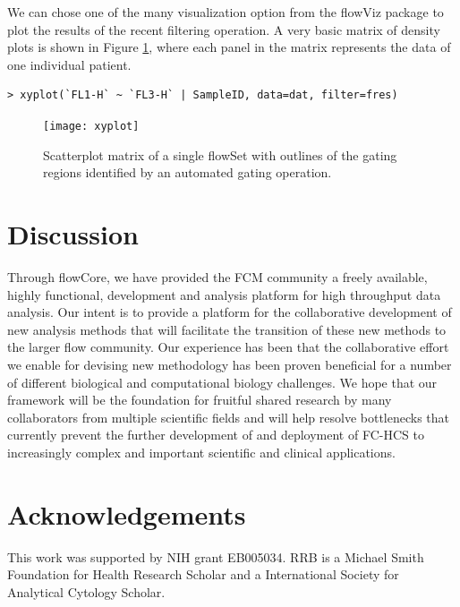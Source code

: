 \documentclass[12pt]{article}
\begin{document}
We can chose one of the many visualization option from the flowViz
package to plot the results of the recent filtering operation. A very
basic matrix of density plots is shown in Figure \ref{xyplot}, where
each panel in the matrix represents the data of one individual
patient.

\begin{verbatim}
> xyplot(`FL1-H` ~ `FL3-H` | SampleID, data=dat, filter=fres)
\end{verbatim}


\begin{figure}[htbp]
\centering
\texttt{[image: xyplot]}
\caption{\label{xyplot}%
Scatterplot matrix of a single flowSet with outlines of the gating
regions identified by an automated gating operation.}
\end{figure}



\section*{Discussion}

Through flowCore, we have provided the FCM community a freely
available, highly functional, development and analysis platform for
high throughput data analysis. Our intent is to provide a platform for
the collaborative development of new analysis methods that will
facilitate the transition of these new methods to the larger flow
community. Our experience has been that the collaborative effort we
enable for devising new methodology has been proven beneficial for a
number of different biological and computational biology challenges.
We hope that our framework will be the foundation for fruitful shared
research by many collaborators from multiple scientific fields and
will help resolve bottlenecks that currently prevent the further
development of and deployment of FC-HCS to increasingly complex and
important scientific and clinical applications.

\section*{Acknowledgements}
This work was supported by NIH grant EB005034. RRB is a Michael Smith
Foundation for Health Research Scholar and a International Society for
Analytical Cytology Scholar.

  
 
\end{document}
